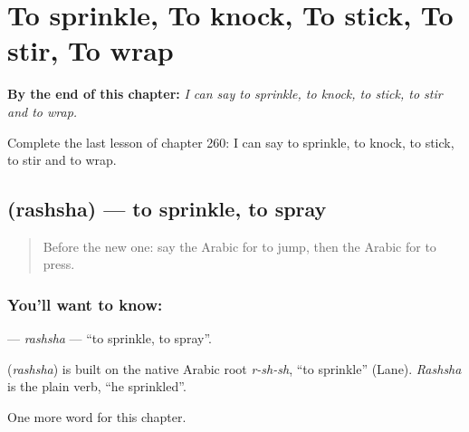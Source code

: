 
\chapter{To sprinkle, To knock, To stick, To stir, To wrap}
\label{ch:ar-to-sprinkle-to-knock-to-stick-to-stir-to-wrap}

\begin{chapteropening}
\textbf{By the end of this chapter:} \emph{I can say to sprinkle, to knock, to stick, to stir and to wrap.}

Complete the last lesson of chapter 260: I can say to sprinkle, to knock, to stick, to stir and to wrap.
\end{chapteropening}

\section[\texorpdfstring{\ar{رش} (rashsha)}{رش (rashsha)}]{ (rashsha) — to sprinkle, to spray}

\label{lesson:AR-C260-rashsha}



\begin{quote}
Before the new one: say the Arabic for to jump, then the Arabic for to press.
\end{quote}

\subsection*{You'll want to know: }
\textbf{} — \emph{rashsha} — \textquotedblleft{}to sprinkle, to spray\textquotedblright{}.

\begin{cousinweb}
\textbf{} (\emph{rashsha}) is built on the native Arabic root \emph{r-sh-sh}, \textquotedblleft{}to sprinkle\textquotedblright{} (Lane). \emph{Rashsha} is the plain verb, \textquotedblleft{}he sprinkled\textquotedblright{}.
\end{cousinweb}

\begin{grammarlens}[title={What you've built}]
One more word for this chapter.
\end{grammarlens}

